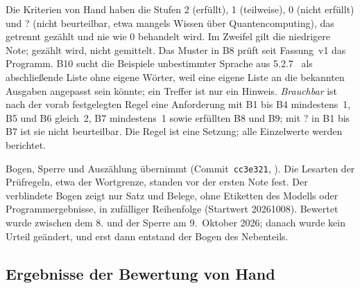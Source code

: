 \documentclass[11pt,a4paper]{report}
\begin{document}
Die Kriterien von Hand haben die Stufen 2 (erfüllt), 1 (teilweise), 0
(nicht erfüllt) und ? (nicht beurteilbar, etwa mangels Wissen über
Quantencomputing), das getrennt gezählt und nie wie 0 behandelt wird. Im
Zweifel gilt die niedrigere Note; gezählt wird, nicht gemittelt. Das
Muster in B8 prüft seit Fassung~v1 das Programm. B10 sucht die Beispiele
unbestimmter Sprache aus 5.2.7~\cite[Abschn.~5.2.7]{iso29148} als
abschließende Liste ohne eigene Wörter, weil eine eigene Liste an die
bekannten Ausgaben angepasst sein könnte; ein Treffer ist nur ein
Hinweis. \emph{Brauchbar} ist nach der vorab festgelegten Regel eine
Anforderung mit B1 bis B4 mindestens~1, B5 und B6 gleich~2, B7 mindestens~1
sowie erfüllten B8 und B9; mit ? in B1 bis B7 ist sie nicht beurteilbar.
Die Regel ist eine Setzung; alle Einzelwerte werden berichtet.

Bogen, Sperre und Auszählung übernimmt 
(Commit~\texttt{cc3e321}, ).
Die Lesarten der Prüfregeln, etwa der Wortgrenze, standen vor der ersten
Note fest. Der verblindete Bogen zeigt nur Satz und Belege, ohne
Etiketten des Modells oder Programmergebnisse, in zufälliger Reihenfolge
(Startwert 20261008). Bewertet wurde zwischen dem 8. und der Sperre am
9.~Oktober 2026; danach wurde kein Urteil geändert, und erst dann
entstand der Bogen des Nebenteils.

\subsection{Ergebnisse der Bewertung von Hand}
\label{subsec:bewertung-hand}
\end{document}

